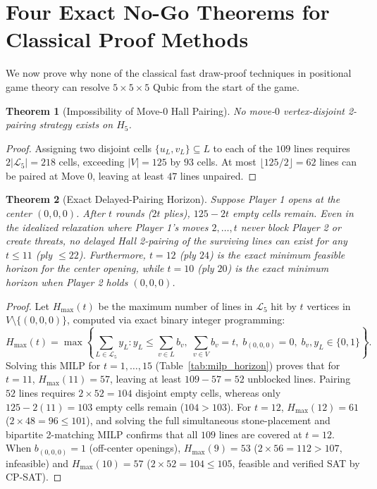 \documentclass[11pt,a4paper]{article}
\newtheorem{theorem}{Theorem}[section]
\theoremstyle{definition}
\theoremstyle{remark}
\begin{document}
\section{Four Exact No-Go Theorems for Classical Proof Methods}

We now prove why none of the classical fast draw-proof techniques in positional game theory can resolve $5 \times 5 \times 5$ Qubic from the start of the game.

\begin{theorem}[Impossibility of Move-0 Hall Pairing]
\label{thm:nogo1}
No move-$0$ vertex-disjoint 2-pairing strategy exists on $H_5$.
\end{theorem}
\begin{proof}
Assigning two disjoint cells $\{u_L, v_L\} \subseteq L$ to each of the $109$ lines requires $2|\mathcal{L}_5| = 218$ cells, exceeding $|V| = 125$ by $93$ cells. At most $\lfloor 125/2 \rfloor = 62$ lines can be paired at Move $0$, leaving at least $47$ lines unpaired.
\end{proof}

\begin{theorem}[Exact Delayed-Pairing Horizon]
\label{thm:nogo2}
Suppose Player 1 opens at the center $(0,0,0)$. After $t$ rounds ($2t$ plies), $125 - 2t$ empty cells remain. Even in the idealized relaxation where Player 1's moves $2,\dots,t$ never block Player 2 or create threats, no delayed Hall 2-pairing of the surviving lines can exist for any $t \le 11$ (ply $\le 22$). Furthermore, $t = 12$ (ply $24$) is the exact minimum feasible horizon for the center opening, while $t = 10$ (ply $20$) is the exact minimum horizon when Player 2 holds $(0,0,0)$.
\end{theorem}
\begin{proof}
Let $H_{\max}(t)$ be the maximum number of lines in $\mathcal{L}_5$ hit by $t$ vertices in $V \setminus \{(0,0,0)\}$, computed via exact binary integer programming:
\begin{equation}
    H_{\max}(t) = \max \left\{ \sum_{L \in \mathcal{L}_5} y_L : y_L \le \sum_{v \in L} b_v, \; \sum_{v \in V} b_v = t, \; b_{(0,0,0)} = 0, \; b_v, y_L \in \{0,1\} \right\}.
\end{equation}
Solving this MILP for $t = 1,\dots,15$ (Table~\ref{tab:milp_horizon}) proves that for $t = 11$, $H_{\max}(11) = 57$, leaving at least $109 - 57 = 52$ unblocked lines. Pairing $52$ lines requires $2 \times 52 = 104$ disjoint empty cells, whereas only $125 - 2(11) = 103$ empty cells remain ($104 > 103$). For $t = 12$, $H_{\max}(12) = 61$ ($2 \times 48 = 96 \le 101$), and solving the full simultaneous stone-placement and bipartite 2-matching MILP confirms that all $109$ lines are covered at $t = 12$. When $b_{(0,0,0)} = 1$ (off-center openings), $H_{\max}(9) = 53$ ($2 \times 56 = 112 > 107$, infeasible) and $H_{\max}(10) = 57$ ($2 \times 52 = 104 \le 105$, feasible and verified SAT by CP-SAT).
\end{proof}
\end{document}
